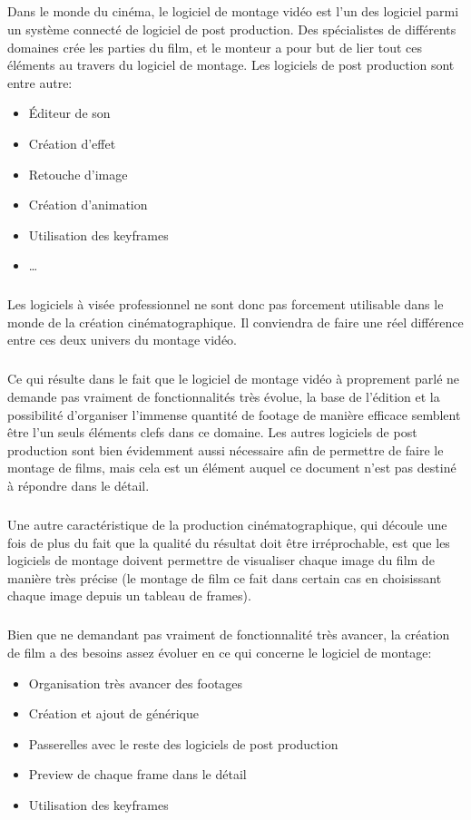 \subparagraph{}
Dans le monde du cinéma, le logiciel de montage vidéo est l'un des logiciel
parmi un système connecté de logiciel de post production. Des spécialistes de
différents domaines crée les parties du film, et le monteur a pour but
de lier tout ces éléments au travers du logiciel de montage. Les logiciels
de post production sont entre autre:
\begin{itemize}
  \item{Éditeur de son}
  \item{Création d'effet}
  \item{Retouche d'image}
  \item{Création d'animation}
  \item{Utilisation des keyframes}
  \item{\ldots}
\end{itemize}

\subparagraph{}
Les logiciels à visée professionnel ne sont donc pas forcement utilisable dans
le monde de la création cinématographique. Il conviendra de faire une réel
différence entre ces deux univers du montage vidéo.

\subparagraph{}
Ce qui résulte dans le fait que le logiciel de montage vidéo à proprement parlé ne
demande pas vraiment de fonctionnalités très évolue, la base de l'édition
et la possibilité d'organiser l'immense quantité de footage de manière efficace
semblent être l'un seuls éléments clefs dans ce domaine. Les autres logiciels de
post production sont bien évidemment aussi nécessaire afin de permettre de faire
le montage de films, mais cela est un élément auquel ce document n'est pas destiné
à répondre dans le détail.

\subparagraph{}
Une autre caractéristique de la production cinématographique, qui découle une
fois de plus du fait que la qualité du résultat doit être irréprochable, est
que les logiciels de montage doivent permettre de visualiser chaque image du
film de manière très précise (le montage de film ce fait dans certain cas en
choisissant chaque image depuis un tableau de frames).


\subparagraph{}
Bien que ne demandant pas vraiment de fonctionnalité très avancer, la création
de film a des besoins assez évoluer en ce qui concerne le logiciel de montage:
\begin{itemize}
  \item{Organisation très avancer des footages}
  \item{Création et ajout de générique}
  \item{Passerelles avec le reste des logiciels de post production}
  \item{Preview de chaque frame dans le détail}
  \item{Utilisation des keyframes}
\end{itemize}

